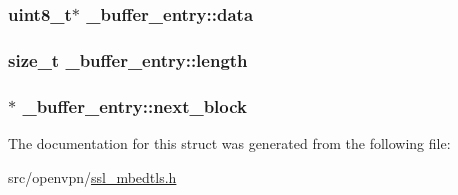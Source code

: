 \subsubsection[{data}]{\setlength{\rightskip}{0pt plus 5cm}uint8\+\_\+t$\ast$ \+\_\+buffer\+\_\+entry\+::data}\label{struct__buffer__entry_a925fd118a4efa1225ab3164a1027f3ca}
\hypertarget{struct__buffer__entry_a05ceac1b681aed72f7cf03e90dba2923}{}
\subsubsection[{length}]{\setlength{\rightskip}{0pt plus 5cm}size\+\_\+t \+\_\+buffer\+\_\+entry\+::length}\label{struct__buffer__entry_a05ceac1b681aed72f7cf03e90dba2923}
\hypertarget{struct__buffer__entry_af05ee663034cc64b90daff5934e0f55a}{}
\subsubsection[{next\+\_\+block}]{$\ast$ \+\_\+buffer\+\_\+entry\+::next\+\_\+block}\label{struct__buffer__entry_af05ee663034cc64b90daff5934e0f55a}


The documentation for this struct was generated from the following file\+:\begin{DoxyCompactItemize}
\item 
src/openvpn/\hyperlink{ssl__mbedtls_8h}{ssl\+\_\+mbedtls.\+h}\end{DoxyCompactItemize}
